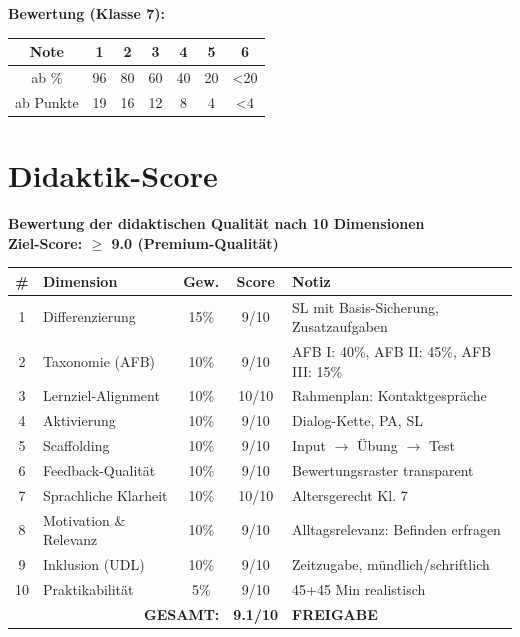 \documentclass[11pt,a4paper]{article}
\begin{document}
\textbf{Bewertung (Klasse 7):}
\begin{tabular}{|c|c|c|c|c|c|c|}
\hline
Note & 1 & 2 & 3 & 4 & 5 & 6 \\
\hline
ab \% & 96 & 80 & 60 & 40 & 20 & <20 \\
\hline
ab Punkte & 19 & 16 & 12 & 8 & 4 & <4 \\
\hline
\end{tabular}

\newpage
\section{Didaktik-Score}

\begin{scorebox}
\textbf{Bewertung der didaktischen Qualität nach 10 Dimensionen}\\
\textbf{Ziel-Score: $\geq$ 9.0 (Premium-Qualität)}

\vspace{1em}
\begin{tabular}{|c|l|c|c|p{4.5cm}|}
\hline
\textbf{\#} & \textbf{Dimension} & \textbf{Gew.} & \textbf{Score} & \textbf{Notiz} \\
\hline
1 & Differenzierung & 15\% & 9/10 & SL mit Basis-Sicherung, Zusatzaufgaben \\
\hline
2 & Taxonomie (AFB) & 10\% & 9/10 & AFB I: 40\%, AFB II: 45\%, AFB III: 15\% \\
\hline
3 & Lernziel-Alignment & 10\% & 10/10 & Rahmenplan: Kontaktgespräche \\
\hline
4 & Aktivierung & 10\% & 9/10 & Dialog-Kette, PA, SL \\
\hline
5 & Scaffolding & 10\% & 9/10 & Input $\rightarrow$ Übung $\rightarrow$ Test \\
\hline
6 & Feedback-Qualität & 10\% & 9/10 & Bewertungsraster transparent \\
\hline
7 & Sprachliche Klarheit & 10\% & 10/10 & Altersgerecht Kl. 7 \\
\hline
8 & Motivation \& Relevanz & 10\% & 9/10 & Alltagsrelevanz: Befinden erfragen \\
\hline
9 & Inklusion (UDL) & 10\% & 9/10 & Zeitzugabe, mündlich/schriftlich \\
\hline
10 & Praktikabilität & 5\% & 9/10 & 45+45 Min realistisch \\
\hline
\multicolumn{3}{|r|}{\textbf{GESAMT:}} & \textbf{9.1/10} & \textcolor{successgreen}{\textbf{FREIGABE}} \\
\hline
\end{tabular}
\end{scorebox}
\end{document}
